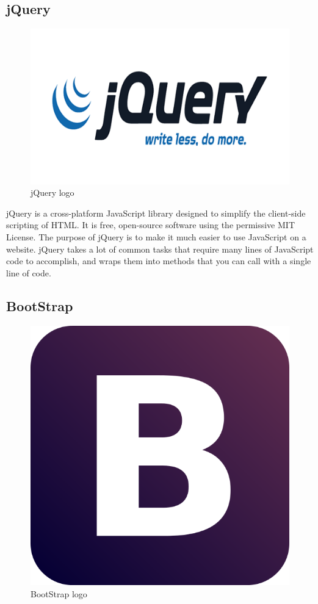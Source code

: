 \subsection{jQuery} 
\begin{figure}[h!]
\centering \includegraphics[scale=0.3]{input/images/jquery.png}
\caption{jQuery logo}
\end{figure}
jQuery is a cross-platform JavaScript library designed to simplify the client-side scripting of HTML. It is free, open-source software using the permissive MIT License. The purpose of jQuery is to make it much easier to use JavaScript on a website. jQuery takes a lot of common tasks that require many lines of JavaScript code to accomplish, and wraps them into methods that you can call with a single line of code.

\subsection{BootStrap} 
\begin{figure}[h!]
\centering \includegraphics[scale=0.2]{input/images/boot.png}
\caption{BootStrap logo}
\end{figure}

